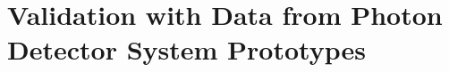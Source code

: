 \section{Validation with Data from Photon Detector System Prototypes}
\label{sec:fddp-pds-prototypes}


